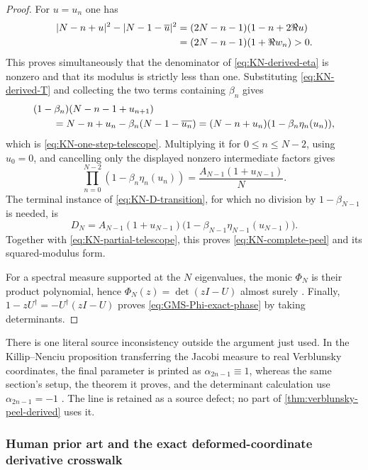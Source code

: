 \begin{proof}
For $u=u_n$ one has
\begin{align}
 |N-n+u|^2-|N-1-\overline u|^2
 &=(2N-n-1)(1-n+2\Re u)\notag\\
 &=(2N-n-1)(1+\Re w_n)>0.
 \label{eq:KN-eta-difference}
\end{align}
This proves simultaneously that the denominator of \eqref{eq:KN-derived-eta} is nonzero
and that its modulus is strictly less than one.  Substituting
\eqref{eq:KN-derived-T} and collecting the two terms containing $\beta_n$ gives
\begin{align}
 &(1-\beta_n)(N-n-1+u_{n+1})\notag\\
 &\qquad=N-n+u_n-\beta_n(N-1-\overline{u_n})
 =(N-n+u_n)(1-\beta_n\eta_n(u_n)),
\end{align}
which is \eqref{eq:KN-one-step-telescope}.  Multiplying it for
$0\leq n\leq N-2$, using $u_0=0$, and cancelling only the displayed nonzero
intermediate factors gives
\begin{equation}
 \prod_{n=0}^{N-2}(1-\beta_n\eta_n(u_n))
 =\frac{A_{N-1}(1+u_{N-1})}{N}.
 \label{eq:KN-partial-telescope}
\end{equation}
The terminal instance of \eqref{eq:KN-D-transition}, for which no division by
$1-\beta_{N-1}$ is needed, is
\begin{equation}
 D_N=A_{N-1}(1+u_{N-1})
 \bigl(1-\beta_{N-1}\eta_{N-1}(u_{N-1})\bigr).
\end{equation}
Together with \eqref{eq:KN-partial-telescope}, this proves
\eqref{eq:KN-complete-peel} and its squared-modulus form.

For a spectral measure supported at the $N$ eigenvalues, the monic $\Phi_N$ is their
product polynomial, hence $\Phi_N(z)=\det(zI-U)$ almost surely
\cite[finite-support discussion and App.~B]{killipNenciu2004}.  Finally,
$1-zU^\dagger=-U^\dagger(zI-U)$ proves \eqref{eq:GMS-Phi-exact-phase} by taking
determinants.
\end{proof}

There is one literal source inconsistency outside the argument just used.  In the
Killip--Nenciu proposition transferring the Jacobi measure to real Verblunsky coordinates,
the final parameter is printed as $\alpha_{2n-1}\equiv1$, whereas the same section's setup,
the theorem it proves, and the determinant calculation use $\alpha_{2n-1}=-1$
\cite[Prop.~5.3 and the surrounding discussion]{killipNenciu2004}.  The line is retained as
a source defect; no part of \cref{thm:verblunsky-peel-derived} uses it.

\subsubsection{Human prior art and the exact deformed-coordinate derivative crosswalk}

